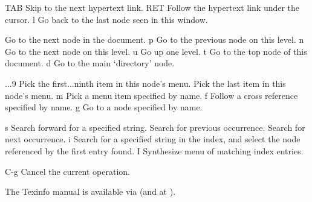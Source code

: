 \infokey TAB         Skip to the next hypertext link.\cr
\infokey RET         Follow the hypertext link under the cursor.\cr
\infokey l           Go back to the last node seen in this window.\cr

           Go to the next node in the document.\cr
\infokey p           Go to the previous node on this level.\cr
\infokey n           Go to the next node on this level.\cr
\infokey u           Go up one level.\cr
\infokey t           Go to the top node of this document.\cr
\infokey d           Go to the main `directory' node.\cr

...9       Pick the first...ninth item in this node's menu.\cr
{}           Pick the last item in this node's menu.\cr
\infokey m           Pick a menu item specified by name.\cr
\infokey f           Follow a cross reference specified by name.\cr
\infokey g           Go to a node specified by name.\cr

\infokey s           Search forward for a specified string.\cr
\infokey \lbracechar{}           Search for previous occurrence.\cr
\infokey \rbracechar{}           Search for next occurrence.\cr
\infokey i           Search for a specified string in the index, and\cr
\infokey {}              select the node referenced by the first entry found.\cr
\infokey I           Synthesize menu of matching index entries.\cr

\infokey C-g         Cancel the current operation.\cr
\endinfokeys

The Texinfo manual is available via \linebreak
(and at ).

\copyrightnotice
\bye

